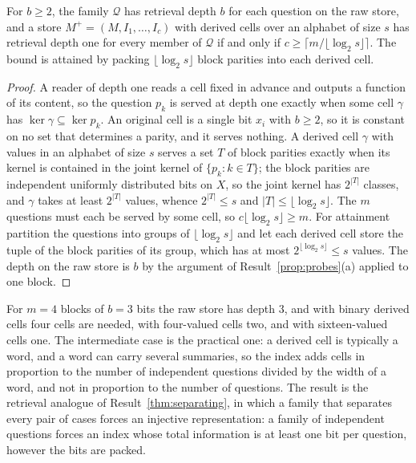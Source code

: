 \begin{newresult}\label{prop:packing}
For $b\ge2$, the family $\mathcal Q$ has retrieval depth $b$ for each question on the raw store, and a store $M^{+}=(M,I_1,\dots,I_c)$ with derived cells over an alphabet of size $s$ has retrieval depth one for every member of $\mathcal Q$ if and only if $c\ge\lceil m/\lfloor\log_2 s\rfloor\rceil$. The bound is attained by packing $\lfloor\log_2s\rfloor$ block parities into each derived cell.
\end{newresult}
\begin{proof}
A reader of depth one reads a cell fixed in advance and outputs a function of its content, so the question $p_k$ is served at depth one exactly when some cell $\gamma$ has $\ker\gamma\subseteq\ker p_k$. An original cell is a single bit $x_i$ with $b\ge2$, so it is constant on no set that determines a parity, and it serves nothing. A derived cell $\gamma$ with values in an alphabet of size $s$ serves a set $T$ of block parities exactly when its kernel is contained in the joint kernel of $\{p_k:k\in T\}$; the block parities are independent uniformly distributed bits on $X$, so the joint kernel has $2^{|T|}$ classes, and $\gamma$ takes at least $2^{|T|}$ values, whence $2^{|T|}\le s$ and $|T|\le\lfloor\log_2s\rfloor$. The $m$ questions must each be served by some cell, so $c\lfloor\log_2s\rfloor\ge m$. For attainment partition the questions into groups of $\lfloor\log_2s\rfloor$ and let each derived cell store the tuple of the block parities of its group, which has at most $2^{\lfloor\log_2 s\rfloor}\le s$ values. The depth on the raw store is $b$ by the argument of Result~\ref{prop:probes}(a) applied to one block.
\end{proof}

For $m=4$ blocks of $b=3$ bits the raw store has depth $3$, and with binary derived cells four cells are needed, with four-valued cells two, and with sixteen-valued cells one. The intermediate case is the practical one: a derived cell is typically a word, and a word can carry several summaries, so the index adds cells in proportion to the number of independent questions divided by the width of a word, and not in proportion to the number of questions. The result is the retrieval analogue of Result~\ref{thm:separating}, in which a family that separates every pair of cases forces an injective representation: a family of independent questions forces an index whose total information is at least one bit per question, however the bits are packed.


